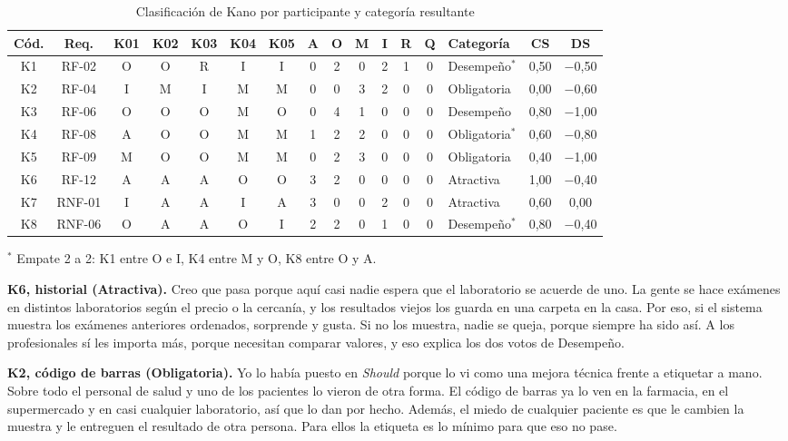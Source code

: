 \documentclass[11pt,a4paper]{article}
\begin{document}
\begin{table}[htbp]
\centering
\caption{Clasificación de Kano por participante y categoría resultante}\label{tab:kano-resultados}
{\small\setlength{\tabcolsep}{3.5pt}
\begin{tabular}{|c|c|c|c|c|c|c|c|c|c|c|c|c|l|c|c|}
\hline
\textbf{Cód.} & \textbf{Req.} & \textbf{K01} & \textbf{K02} & \textbf{K03} & \textbf{K04} & \textbf{K05} & \textbf{A} & \textbf{O} & \textbf{M} & \textbf{I} & \textbf{R} & \textbf{Q} & \textbf{Categoría} & \textbf{CS} & \textbf{DS}\\
\hline
K1 & RF-02 & O & O & R & I & I & 0 & 2 & 0 & 2 & 1 & 0 & Desempeño$^{*}$ & 0,50 & $-$0,50\\
\hline
K2 & RF-04 & I & M & I & M & M & 0 & 0 & 3 & 2 & 0 & 0 & Obligatoria & 0,00 & $-$0,60\\
\hline
K3 & RF-06 & O & O & O & M & O & 0 & 4 & 1 & 0 & 0 & 0 & Desempeño & 0,80 & $-$1,00\\
\hline
K4 & RF-08 & A & O & O & M & M & 1 & 2 & 2 & 0 & 0 & 0 & Obligatoria$^{*}$ & 0,60 & $-$0,80\\
\hline
K5 & RF-09 & M & O & O & M & M & 0 & 2 & 3 & 0 & 0 & 0 & Obligatoria & 0,40 & $-$1,00\\
\hline
K6 & RF-12 & A & A & A & O & O & 3 & 2 & 0 & 0 & 0 & 0 & Atractiva & 1,00 & $-$0,40\\
\hline
K7 & RNF-01 & I & A & A & I & A & 3 & 0 & 0 & 2 & 0 & 0 & Atractiva & 0,60 & 0,00\\
\hline
K8 & RNF-06 & O & A & A & O & I & 2 & 2 & 0 & 1 & 0 & 0 & Desempeño$^{*}$ & 0,80 & $-$0,40\\
\hline
\end{tabular}}

\smallskip
{\footnotesize $^{*}$ Empate 2 a 2: K1 entre O e I, K4 entre M y O, K8 entre O y A.}
\end{table}

\textbf{K6, historial (Atractiva).} Creo que pasa porque aquí casi nadie espera que el laboratorio se acuerde de uno. La gente se hace exámenes en distintos laboratorios según el precio o la cercanía, y los resultados viejos los guarda en una carpeta en la casa. Por eso, si el sistema muestra los exámenes anteriores ordenados, sorprende y gusta. Si no los muestra, nadie se queja, porque siempre ha sido así. A los profesionales sí les importa más, porque necesitan comparar valores, y eso explica los dos votos de Desempeño.

\textbf{K2, código de barras (Obligatoria).} Yo lo había puesto en \emph{Should} porque lo vi como una mejora técnica frente a etiquetar a mano. Sobre todo el personal de salud y uno de los pacientes lo vieron de otra forma. El código de barras ya lo ven en la farmacia, en el supermercado y en casi cualquier laboratorio, así que lo dan por hecho. Además, el miedo de cualquier paciente es que le cambien la muestra y le entreguen el resultado de otra persona. Para ellos la etiqueta es lo mínimo para que eso no pase.
\end{document}
